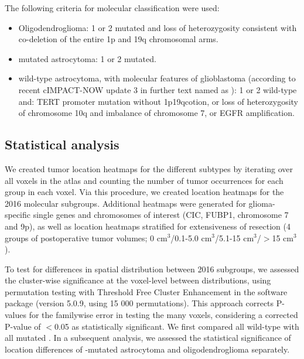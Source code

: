 The following criteria for molecular classification were used:

\begin{itemize}

\item Oligodendroglioma: 1 or 2 mutated and loss of heterozygosity consistent with co-deletion of the entire 1p and 19q chromosomal arms.

\item {} mutated astrocytoma: 1 or 2 mutated.

\item {} wild-type astrocytoma, with molecular features of glioblastoma (according to recent cIMPACT-NOW update 3 \autocite{brat2018}  in further text named as ): 1 or 2 wild-type and: TERT promoter mutation without \acl{1p19qcotion}, or loss of heterozygosity of chromosome 10q and imbalance of chromosome 7, or EGFR amplification.

\end{itemize}

\subsection{Statistical analysis}
We created \gls{tumor} location heatmaps for the different  subtypes by iterating over all voxels in the  atlas and counting the number of \gls{tumor} occurrences for each group in each voxel.
Via this procedure, we created location heatmaps for the  2016 molecular subgroups.
Additional heatmaps were generated for glioma-specific single genes and chromosomes of interest (CIC, FUBP1, chromosome 7 and 9p), as well as location heatmaps stratified for extensiveness of resection (4 groups of postoperative \gls{tumor} volumes; 0 cm$^3$/0.1-5.0 cm$^3$/5.1-15 cm$^3$/$>$15 cm$^3$).

To test for differences in spatial distribution between  2016 subgroups, we assessed the cluster-wise significance at the voxel-level between distributions, using permutation testing with Threshold Free Cluster Enhancement in the software package  \autocite{winkler2014permutation} (version 5.0.9, using 15 000 permutations).
This approach corrects P-values for the familywise error in testing the many voxels, considering a corrected P-value of $<$0.05 as statistically significant.
We first compared all  wild-type  with all  mutated .
In a subsequent analysis, we assessed the statistical significance of location differences of -mutated astrocytoma and oligodendroglioma separately.


